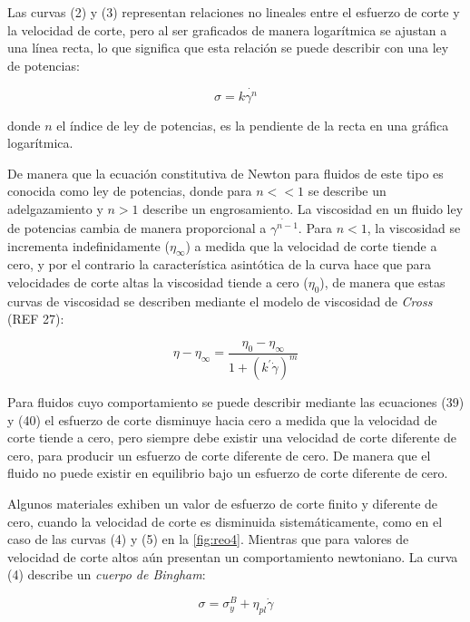 Las curvas (2) y (3) representan relaciones no lineales entre el esfuerzo de corte y la velocidad de corte, pero al ser graficados de manera logarítmica se ajustan a una línea recta, lo que significa que esta relación se puede describir con una ley de potencias:

\begin{equation}
\sigma = k\dot{\gamma^{n}}
\end{equation}

donde $n$ el índice de ley de potencias, es la pendiente de la recta en una gráfica logarítmica.

De manera que la ecuación constitutiva de Newton para fluidos de este tipo es conocida como ley de potencias, donde para $n<<1$ se describe un adelgazamiento y $n>1$ describe un engrosamiento. La viscosidad en un fluido ley de potencias cambia de manera proporcional a $\dot{\gamma^{n-1}}$. Para $n<1$, la viscosidad se incrementa indefinidamente ($\eta_{\infty}$) a medida que la velocidad de corte tiende a cero, y por el contrario la característica asintótica de la curva hace que para velocidades de corte altas la viscosidad tiende a cero ($\eta_{0}$), de manera que estas curvas de viscosidad se describen mediante el modelo de viscosidad de \emph{Cross} (REF 27):

\begin{equation}
\eta-\eta_{\infty}=\frac{\eta_{0}-\eta_{\infty}}{1+(k^{'}\dot{\gamma})^{m}}
\end{equation}

Para fluidos cuyo comportamiento se puede describir mediante las ecuaciones (39) y (40) el esfuerzo de corte disminuye hacia cero a medida que la velocidad de corte tiende a cero, pero siempre debe existir una velocidad de corte diferente de cero, para producir un esfuerzo de corte diferente de cero. De manera que el fluido no puede existir en equilibrio bajo un esfuerzo de corte diferente de cero.

Algunos materiales exhiben un valor de esfuerzo de corte finito y diferente de cero, cuando la velocidad de corte es disminuida sistemáticamente, como en el caso de las curvas (4) y (5) en la \autoref{fig:reo4}. Mientras que para valores de velocidad de corte altos aún presentan un comportamiento newtoniano. La curva (4) describe un \emph{cuerpo de Bingham}:

\begin{equation}
\sigma = \sigma^{B}_{y} + \eta_{pl}\dot{\gamma}
\end{equation}

